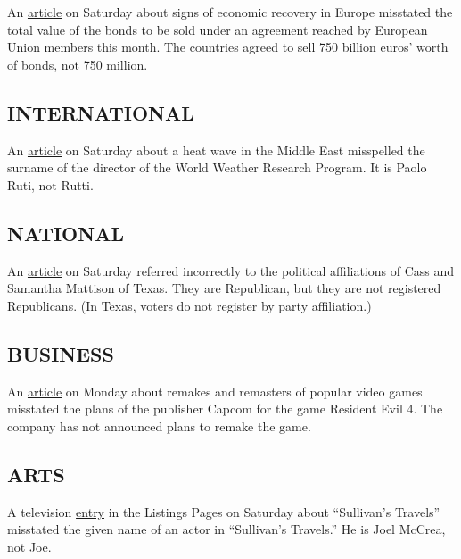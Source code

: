 An
\href{https://www.nytimes.com/2020/07/31/business/europe-economy-recovery-coronavirus.html}{article}
on Saturday about signs of economic recovery in Europe misstated the
total value of the bonds to be sold under an agreement reached by
European Union members this month. The countries agreed to sell 750
billion euros' worth of bonds, not 750 million.

\hypertarget{international}{%
\subsection{INTERNATIONAL}\label{international}}

An
\href{https://www.nytimes.com/2020/07/31/world/middleeast/Middle-East-heat-wave.html}{article}
on Saturday about a heat wave in the Middle East misspelled the surname
of the director of the World Weather Research Program. It is Paolo Ruti,
not Rutti.

\hypertarget{national}{%
\subsection{NATIONAL}\label{national}}

An
\href{https://www.nytimes.com/2020/08/01/us/politics/trump-suburban-voters-republicans-house.html}{article}
on Saturday referred incorrectly to the political affiliations of Cass
and Samantha Mattison of Texas. They are Republican, but they are not
registered Republicans. (In Texas, voters do not register by party
affiliation.)

\hypertarget{business}{%
\subsection{BUSINESS}\label{business}}

An
\href{https://www.nytimes.com/2020/08/01/business/video-game-remake-remaster-nostalgia.html}{article}
on Monday about remakes and remasters of popular video games misstated
the plans of the publisher Capcom for the game Resident Evil 4. The
company has not announced plans to remake the game.

\hypertarget{arts}{%
\subsection{ARTS}\label{arts}}

A television
\href{https://www.nytimes.com/2020/08/01/arts/television/whats-on-tv-saturday-seeing-america-with-megan-rapinoe-and-the-last-narc.html}{entry}
in the Listings Pages on Saturday about ``Sullivan's Travels'' misstated
the given name of an actor in ``Sullivan's Travels.'' He is Joel McCrea,
not Joe.

